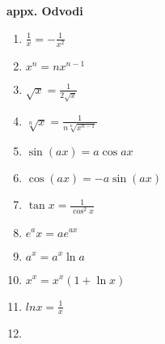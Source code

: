 \documentclass{article}
\begin{document}
\begin{multicols}{3}
\textbf{appx. Odvodi}
\begin{center}
    \begin{small}
        \begin{enumerate}
            \item \begin{math}
                \frac{1}{x} = -\frac{1}{x^2}
            \end{math}
            \item \begin{math}
                x^n  = nx^{n-1}
            \end{math}
            \item \begin{math}
                \sqrt{x} = \frac{1}{2 \sqrt{x}}
            \end{math}
            \item \begin{math}
                \sqrt[n] x = \frac{1}{n \sqrt[n]{x^{n-1}}}
            \end{math}
            \item \begin{math}
                \sin (a x) =  a  \cos a x
            \end{math}
            \item  \begin{math}
                \cos (a x) = - a \sin (a x)
            \end{math}
            \item \begin{math}
                \tan x = \frac{1}{\cos^2 x} 
            \end{math}
            \item \begin{math}
                e^ax = ae^{ax}
            \end{math}
            \item \begin{math}
                a^x = a^x \ln a
            \end{math}
            \item \begin{math}
                x^x = x^x (1+\ln x)
            \end{math}
            \item \begin{math}
                ln x = \frac{1}{x}
            \end{math}
            \item \begin{math}

\end{math}
\end{enumerate}
\end{small}
\end{center}
\end{multicols}
\end{document}
